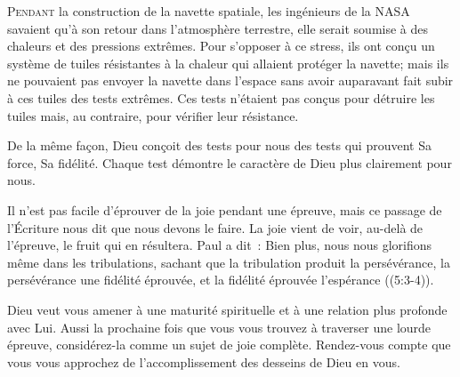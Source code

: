 \dvrule






\lettrine{P}{endant} la construction de la navette spatiale,
 les ingénieurs de la NASA savaient qu'à son retour
 dans l'atmosphère terrestre, elle serait soumise à des chaleurs
 et des pressions extrêmes.
 Pour s'opposer à ce stress, ils ont conçu un système de tuiles
 résistantes à la chaleur qui allaient protéger la navette;
 mais ils ne pouvaient pas envoyer la navette dans l'espace
 sans avoir auparavant fait subir à ces tuiles des tests extrêmes.
 Ces tests n'étaient pas conçus pour détruire les tuiles mais,
 au contraire, pour vérifier leur résistance. 

De la même façon, Dieu conçoit des tests pour nous \ocadr des tests
 qui prouvent Sa force, Sa fidélité. Chaque test démontre
 le caractère de Dieu plus clairement pour nous. 


Il n'est pas facile d'éprouver de la joie pendant une épreuve,
 mais ce passage de l'Écriture nous dit que nous devons le faire.
 La joie vient de voir, au-delà de l'épreuve, le fruit qui en résultera.
 Paul a dit~: 
 \og Bien plus, nous nous glorifions même dans les tribulations,
 sachant que la tribulation produit la persévérance,
 la persévérance une fidélité éprouvée,
 et la fidélité éprouvée l'espérance \fg{} ((5:3-4)). 

Dieu veut vous amener à une maturité spirituelle et à une relation
 plus profonde avec Lui. Aussi la prochaine fois que vous vous trouvez
 à traverser une lourde épreuve, considérez-la 
 comme un sujet de joie complète.
 Rendez-vous compte que vous vous approchez de l'accomplissement
 des desseins de Dieu en vous. 

\dvrule




